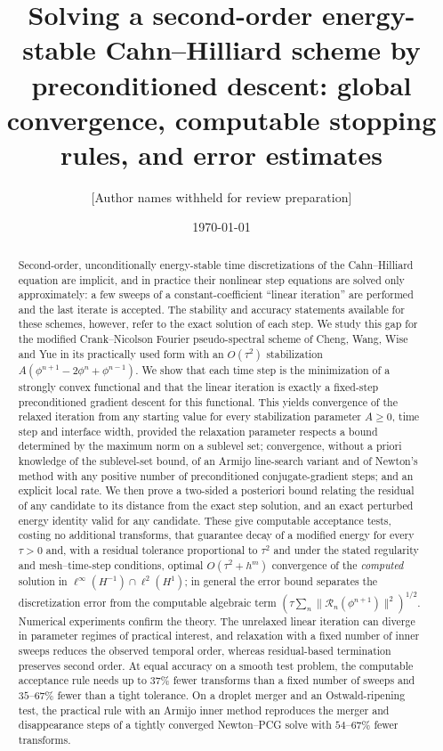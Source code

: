 \documentclass[11pt]{amsart}
\title[Inner iterations for a second-order Cahn--Hilliard scheme]{Solving a second-order energy-stable Cahn--Hilliard scheme by preconditioned descent: global convergence, computable stopping rules, and error estimates}
\author{[Author names withheld for review preparation]}
\date{\today}
\theoremstyle{definition}
\theoremstyle{remark}
\numberwithin{equation}{section}
\newcommand{\nrm}[1]{\lVert #1\rVert}
\newcommand{\Rn}{\mathcal{R}_n}
\begin{document}
\begin{abstract}
Second-order, unconditionally energy-stable time discretizations of the Cahn--Hilliard equation are implicit, and in practice their nonlinear step equations are solved only approximately: a few sweeps of a constant-coefficient ``linear iteration'' are performed and the last iterate is accepted. The stability and accuracy statements available for these schemes, however, refer to the exact solution of each step. We study this gap for the modified Crank--Nicolson Fourier pseudo-spectral scheme of Cheng, Wang, Wise and Yue in its practically used form with an $O(\tau^2)$ stabilization $A(\phi^{n+1}-2\phi^n+\phi^{n-1})$. We show that each time step is the minimization of a strongly convex functional and that the linear iteration is exactly a fixed-step preconditioned gradient descent for this functional. This yields convergence of the relaxed iteration from any starting value for every stabilization parameter $A\ge 0$, time step and interface width, provided the relaxation parameter respects a bound determined by the maximum norm on a sublevel set; convergence, without a priori knowledge of the sublevel-set bound, of an Armijo line-search variant and of Newton's method with any positive number of preconditioned conjugate-gradient steps; and an explicit local rate. We then prove a two-sided a posteriori bound relating the residual of any candidate to its distance from the exact step solution, and an exact perturbed energy identity valid for any candidate. These give computable acceptance tests, costing no additional transforms, that guarantee decay of a modified energy for every $\tau>0$ and, with a residual tolerance proportional to $\tau^2$ and under the stated regularity and mesh--time-step conditions, optimal $O(\tau^2+h^m)$ convergence of the \emph{computed} solution in $\ell^\infty(H^{-1})\cap\ell^2(H^1)$; in general the error bound separates the discretization error from the computable algebraic term $(\tau\sum_n\nrm{\Rn(\phi^{n+1})}^2)^{1/2}$. Numerical experiments confirm the theory. The unrelaxed linear iteration can diverge in parameter regimes of practical interest, and relaxation with a fixed number of inner sweeps reduces the observed temporal order, whereas residual-based termination preserves second order. At equal accuracy on a smooth test problem, the computable acceptance rule needs up to $37\%$ fewer transforms than a fixed number of sweeps and $35$--$67\%$ fewer than a tight tolerance. On a droplet merger and an Ostwald-ripening test, the practical rule with an Armijo inner method reproduces the merger and disappearance steps of a tightly converged Newton--PCG solve with $54$--$67\%$ fewer transforms.
\end{abstract}
\end{document}
